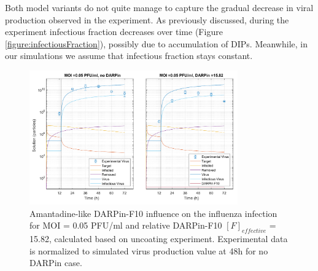 Both model variants do not quite manage to capture the gradual decrease in viral production observed in the experiment. As previously discussed, during the experiment infectious fraction decreases over time (Figure \ref{figure:infectiousFraction}), possibly due to accumulation of DIPs. Meanwhile, in our simulations we assume that infectious fraction stays constant.

\begin{figure}
\begin{center}
\includegraphics[width=0.8\textwidth, trim={0cm 0cm 0cm 0cm}, clip]{D_chapters/3_DARPinModels/2_DARPinInfection/comparisonModelTHillIRVViDelayMOI0.072135DARPin15.816AsymmetricDarpinMyosinInhibitor.pdf}
\caption[Amantadine-like DARPin-F10 for MOI = 0.05 PFU/ml and $F_{effective}$ = 15.82]{Amantadine-like DARPin-F10 influence on the influenza infection for MOI = 0.05 PFU/ml and relative DARPin-F10 $[F]_{effective}$ = 15.82, calculated based on uncoating experiment. Experimental data is normalized to simulated virus production value at 48h for no DARPin case.}
\label{figure:amantadineLikeF15}
\end{center}
\end{figure}

